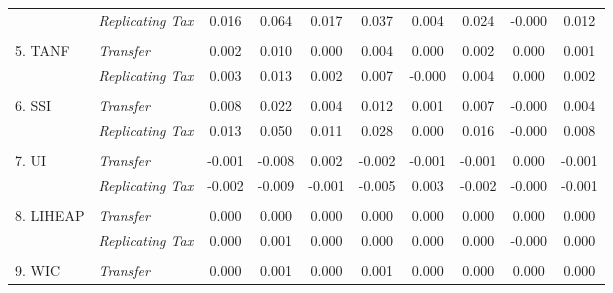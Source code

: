 \begin{tabular}{llcccccccc}
                     & \textit{Replicating Tax}
& 0.016            & 0.064
& 0.017            & 0.037
& 0.004            & 0.024
& -0.000            & 0.012
\\ \\
5. TANF                 & \textit{Transfer}        & 0.002              & 0.010                 & 0.000              & 0.004                 & 0.000              & 0.002                 & 0.000              & 0.001                 \\
                     & \textit{Replicating Tax} & 0.003
& 0.013                   & 0.002
& 0.007                   & -0.000
& 0.004                   & 0.000
& 0.002                   \\ \\
6. SSI                  & \textit{Transfer}        & 0.008               & 0.022                  & 0.004               & 0.012                  & 0.001               & 0.007                  & -0.000               & 0.004                  \\
                     & \textit{Replicating Tax} & 0.013
& 0.050                    & 0.011
& 0.028                    & 0.000
& 0.016                    & -0.000
& 0.008                    \\ \\
7. UI                   & \textit{Transfer}        & -0.001                & -0.008                   & 0.002                & -0.002                   & -0.001                & -0.001                   & 0.000                & -0.001                   \\
                     & \textit{Replicating Tax} & -0.002
& -0.009                     & -0.001
& -0.005                     & 0.003
& -0.002                     & -0.000
& -0.001                     \\ \\
8. LIHEAP               & \textit{Transfer}        & 0.000            & 0.000               & 0.000            & 0.000               & 0.000            & 0.000               & 0.000            & 0.000               \\
                     & \textit{Replicating Tax}
& 0.000              & 0.001
& 0.000              & 0.000
& 0.000              & 0.000
& -0.000              & 0.000
\\ \\
9. WIC                  & \textit{Transfer}        & 0.000               & 0.001                  & 0.000               & 0.001                  & 0.000               & 0.000                  & 0.000               & 0.000                  \\

\end{tabular}
